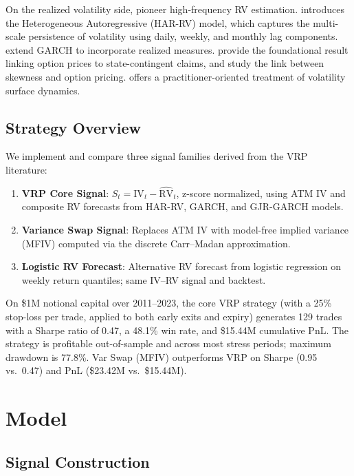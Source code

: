 \documentclass[11pt,a4paper]{article}
\begin{document}
On the realized volatility side, \citet{andersen2003modeling} pioneer high-frequency RV estimation.
\citet{corsi2009simple} introduces the Heterogeneous Autoregressive (HAR-RV) model, which captures the multi-scale persistence of volatility using daily, weekly, and monthly lag components.
\citet{hansen2012realized} extend GARCH to incorporate realized measures.
\citet{breeden1978prices} provide the foundational result linking option prices to state-contingent claims, and \citet{bakshi2003stock} study the link between skewness and option pricing.
\citet{gatheral2006volatility} offers a practitioner-oriented treatment of volatility surface dynamics.

\subsection{Strategy Overview}

We implement and compare three signal families derived from the VRP literature:
\begin{enumerate}[nosep]
    \item \textbf{VRP Core Signal}: $S_t = \text{IV}_t - \widehat{\text{RV}}_t$, z-score normalized, using ATM IV and composite RV forecasts from HAR-RV, GARCH, and GJR-GARCH models.
    \item \textbf{Variance Swap Signal}: Replaces ATM IV with model-free implied variance (MFIV) computed via the discrete Carr--Madan approximation.
    \item \textbf{Logistic RV Forecast}: Alternative RV forecast from logistic regression on weekly return quantiles; same IV--RV signal and backtest.
\end{enumerate}

On \$1M notional capital over 2011--2023, the core VRP strategy (with a 25\% stop-loss per trade, applied to both early exits and expiry) generates 129 trades with a Sharpe ratio of 0.47, a 48.1\% win rate, and \$15.44M cumulative PnL.
The strategy is profitable out-of-sample and across most stress periods; maximum drawdown is 77.8\%. Var Swap (MFIV) outperforms VRP on Sharpe (0.95 vs.\ 0.47) and PnL (\$23.42M vs.\ \$15.44M).


\section{Model}

\subsection{Signal Construction}
\end{document}

